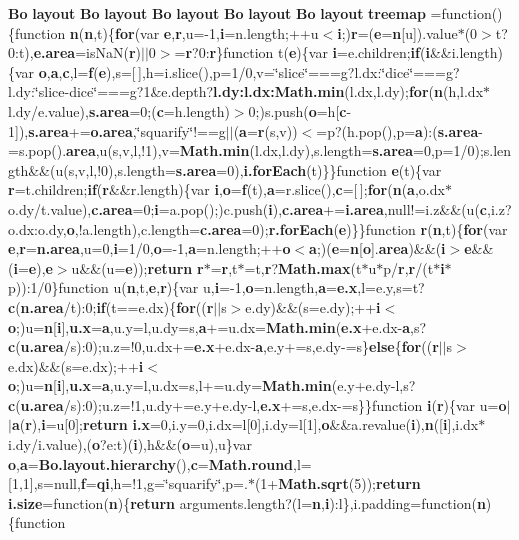 \begin{DoxyCompactItemize}
{\bf Bo} {\bf layout} {\bf Bo} {\bf layout} {\bf Bo} {\bf layout} {\bf Bo} {\bf layout} {\bf Bo} {\bf layout} {\bf treemap} =function()\{function {\bf n}({\bf n},t)\{{\bf for}(var {\bf e},{\bf r},u=-\/1,{\bf i}=n.\+length;++u$<${\bf i};){\bf r}=({\bf e}={\bf n}[u]).value$\ast$(0$>$t?0\+:t),{\bf e.\+area}=is\+Na\+N({\bf r})$\vert$$\vert$0$>$={\bf r}?0\+:{\bf r}\}function t({\bf e})\{var {\bf i}=e.\+children;{\bf if}({\bf i}\&\&i.\+length)\{var {\bf o},{\bf a},{\bf c},l={\bf f}({\bf e}),s=[$\,$],h=i.\+slice(),p=1/0,v=\char`\"{}slice\char`\"{}===g?l.\+dx\+:\char`\"{}dice\char`\"{}===g?l.\+dy\+:\char`\"{}slice-\/dice\char`\"{}===g?1\&e.\+depth?{\bf l.\+dy\+:l.\+dx\+:\+Math.\+min}(l.\+dx,l.\+dy);{\bf for}({\bf n}(h,l.\+dx$\ast$l.\+dy/e.\+value),{\bf s.\+area}=0;({\bf c}=h.\+length)$>$0;)s.\+push({\bf o}=h[{\bf c}-\/1]),{\bf s.\+area}+={\bf o.\+area},\char`\"{}squarify\char`\"{}!==g$\vert$$\vert$({\bf a}={\bf r}(s,v))$<$=p?(h.\+pop(),p={\bf a})\+:({\bf s.\+area}-\/=s.\+pop().{\bf area},u(s,v,l,!1),v={\bf Math.\+min}(l.\+dx,l.\+dy),s.\+length={\bf s.\+area}=0,p=1/0);s.\+length\&\&(u(s,v,l,!0),s.\+length={\bf s.\+area}=0),{\bf i.\+for\+Each}(t)\}\}function {\bf e}(t)\{var {\bf r}=t.\+children;{\bf if}({\bf r}\&\&r.\+length)\{var {\bf i},{\bf o}={\bf f}(t),{\bf a}=r.\+slice(),{\bf c}=[$\,$];{\bf for}({\bf n}({\bf a},o.\+dx$\ast$o.\+dy/t.\+value),{\bf c.\+area}=0;{\bf i}=a.\+pop();)c.\+push({\bf i}),{\bf c.\+area}+={\bf i.\+area},null!=i.\+z\&\&(u({\bf c},i.\+z?o.\+dx\+:o.\+dy,{\bf o},!a.\+length),c.\+length={\bf c.\+area}=0);{\bf r.\+for\+Each}({\bf e})\}\}function {\bf r}({\bf n},t)\{{\bf for}(var {\bf e},{\bf r}={\bf n.\+area},u=0,{\bf i}=1/0,{\bf o}=-\/1,{\bf a}=n.\+length;++{\bf o}$<${\bf a};)({\bf e}={\bf n}[{\bf o}].{\bf area})\&\&({\bf i}$>${\bf e}\&\&({\bf i}={\bf e}),{\bf e}$>$u\&\&(u={\bf e}));{\bf return} {\bf r}$\ast$={\bf r},t$\ast$=t,{\bf r}?{\bf Math.\+max}(t$\ast$u$\ast$p/{\bf r},{\bf r}/(t$\ast${\bf i}$\ast$p))\+:1/0\}function u({\bf n},t,{\bf e},{\bf r})\{var u,{\bf i}=-\/1,{\bf o}=n.\+length,{\bf a}={\bf e.\+x},l=e.\+y,s=t?{\bf c}({\bf n.\+area}/t)\+:0;{\bf if}(t==e.\+dx)\{{\bf for}(({\bf r}$\vert$$\vert$s$>$e.\+dy)\&\&(s=e.\+dy);++{\bf i}$<${\bf o};)u={\bf n}[{\bf i}],{\bf u.\+x}={\bf a},u.\+y=l,u.\+dy=s,{\bf a}+=u.\+dx={\bf Math.\+min}({\bf e.\+x}+e.\+dx-\/{\bf a},s?{\bf c}({\bf u.\+area}/s)\+:0);u.\+z=!0,u.\+dx+={\bf e.\+x}+e.\+dx-\/{\bf a},e.\+y+=s,e.\+dy-\/=s\}{\bf else}\{{\bf for}(({\bf r}$\vert$$\vert$s$>$e.\+dx)\&\&(s=e.\+dx);++{\bf i}$<${\bf o};)u={\bf n}[{\bf i}],{\bf u.\+x}={\bf a},u.\+y=l,u.\+dx=s,l+=u.\+dy={\bf Math.\+min}(e.\+y+e.\+dy-\/l,s?{\bf c}({\bf u.\+area}/s)\+:0);u.\+z=!1,u.\+dy+=e.\+y+e.\+dy-\/l,{\bf e.\+x}+=s,e.\+dx-\/=s\}\}function {\bf i}({\bf r})\{var u={\bf o}$\vert$$\vert${\bf a}({\bf r}),{\bf i}=u[0];{\bf return} {\bf i.\+x}=0,i.\+y=0,i.\+dx=l[0],i.\+dy=l[1],{\bf o}\&\&a.\+revalue({\bf i}),{\bf n}([{\bf i}],i.\+dx$\ast$i.\+dy/i.\+value),({\bf o}?e\+:t)({\bf i}),h\&\&({\bf o}=u),u\}var {\bf o},{\bf a}={\bf Bo.\+layout.\+hierarchy}(),{\bf c}={\bf Math.\+round},l=[1,1],s=null,{\bf f}={\bf qi},h=!1,g=\char`\"{}squarify\char`\"{},p=.$\ast$(1+{\bf Math.\+sqrt}(5));{\bf return} {\bf i.\+size}=function({\bf n})\{{\bf return} arguments.\+length?(l={\bf n},{\bf i})\+:l\},i.\+padding=function({\bf n})\{function 
\end{DoxyCompactItemize}
